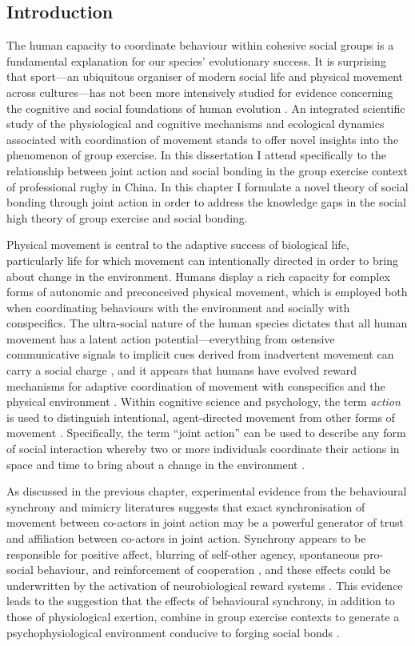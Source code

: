 \begin{CJK}{UTF8}{gbsn}
\section{Introduction}
The human capacity to coordinate behaviour within cohesive social groups is a fundamental explanation for our species' evolutionary success.  It is surprising that sport---an ubiquitous organiser of modern social life and physical movement across cultures---has not been more intensively studied for evidence concerning the cognitive and social foundations of human evolution \citep{Blanchard1995,Downey2005a}.  An integrated scientific study of the physiological and cognitive mechanisms and ecological dynamics associated with coordination of movement stands to offer novel insights into the phenomenon of group exercise.  In this dissertation I attend specifically to the relationship between joint action and social bonding in the group exercise context of professional rugby in China.  In this chapter I formulate a novel theory of social bonding through joint action in order to address the knowledge gaps in the social high theory of group exercise and social bonding.

Physical movement is central to the adaptive success of biological life, particularly life for which movement can intentionally directed in order to bring about change in the environment.  Humans display a rich capacity for complex forms of autonomic and preconceived physical movement, which is employed both when coordinating behaviours with the environment and socially with conspecifics.  The ultra-social nature of the human species dictates that all human movement has a latent action potential---everything from ostensive communicative signals to implicit cues derived from inadvertent movement can carry a social charge \citep{Danchin2004}, and it appears that humans have evolved reward mechanisms for adaptive coordination of movement with conspecifics and the physical environment \citep{Wheatley2012,Parkinson2015,Wheatley2016}. Within cognitive science and psychology, the term \textit{action} is used to distinguish intentional, agent-directed movement from other forms of movement \citep{Davidson1980}.  Specifically, the term ``joint action'' can be used to describe any form of social interaction whereby two or more individuals coordinate their actions in space and time to bring about a change in the environment \citep{Sebanz2006a}.

As discussed in the previous chapter, experimental evidence from the behavioural synchrony and mimicry literatures suggests that exact synchronisation of movement between co-actors in joint action may be a powerful generator of trust and affiliation between co-actors in joint action.  Synchrony appears to be responsible for positive affect, blurring of self-other agency, spontaneous pro-social behaviour, and reinforcement of cooperation \citep{Mogan2017}, and these effects could be underwritten by the activation of neurobiological reward systems \citep{}.  This evidence leads to the suggestion that the effects of behavioural synchrony, in addition to those of physiological exertion, combine in group exercise contexts to generate a psychophysiological environment conducive to forging social bonds \citep{Cohen2017}.


\end{CJK}
